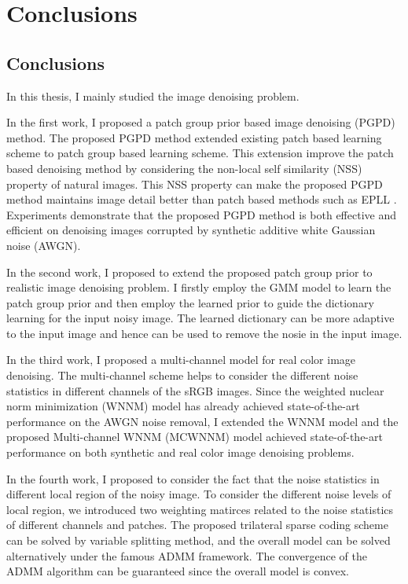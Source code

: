 %
\chapter{Conclusions}
\label{sec:conclusions}


\section{Conclusions}
\label{sec:conclusions:sec1}
In this thesis, I mainly studied the image denoising problem. 

In the first work, I proposed a patch group prior based image denoising (PGPD) method. The proposed PGPD method extended existing patch based learning scheme to patch group based learning scheme. This extension improve the patch based denoising method by considering the non-local self similarity (NSS) property of natural images. This NSS property can make the proposed PGPD method maintains image detail better than patch based methods such as EPLL \cite{epll}. Experiments demonstrate that the proposed PGPD method is both effective and efficient on denoising images corrupted by synthetic additive white Gaussian noise (AWGN).

In the second work, I proposed to extend the proposed patch group prior to realistic image denoising problem. I firstly employ the GMM model to learn the patch group prior and then employ the learned prior to guide the dictionary learning for the input noisy image. The learned dictionary can be more adaptive to the input image and hence can be used to remove the nosie in the input image.

In the third work, I proposed a multi-channel model for real color image denoising. The multi-channel scheme helps to consider the different noise statistics in different channels of the sRGB images. Since the weighted nuclear norm minimization (WNNM) model has already achieved state-of-the-art performance on the AWGN noise removal, I extended the WNNM model and the proposed Multi-channel WNNM (MCWNNM) model achieved state-of-the-art performance on both synthetic and real color image denoising problems. 

In the fourth work, I proposed to consider the fact that the noise statistics in different local region of the noisy image. To consider the different noise levels of local region, we introduced two weighting matirces related to the noise statistics of different channels and patches. The proposed trilateral sparse coding scheme can be solved by variable splitting method, and the overall model can be solved alternatively under the famous ADMM framework. The convergence of the ADMM algorithm can be guaranteed since the overall model is convex.


